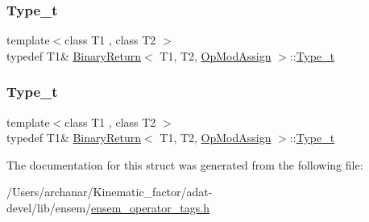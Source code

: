 \mbox{\label{structBinaryReturn_3_01T1_00_01T2_00_01OpModAssign_01_4_ae184d3c020adc86d2a8e45d393ea778c}} 
\subsubsection{\texorpdfstring{Type\_t}{Type\_t}\hspace{0.1cm}{\footnotesize\ttfamily [2/3]}}
{\footnotesize\ttfamily template$<$class T1 , class T2 $>$ \\
typedef T1\& \mbox{\hyperlink{structBinaryReturn}{Binary\+Return}}$<$ T1, T2, \mbox{\hyperlink{structOpModAssign}{Op\+Mod\+Assign}} $>$\+::\mbox{\hyperlink{structBinaryReturn_3_01T1_00_01T2_00_01OpModAssign_01_4_ae184d3c020adc86d2a8e45d393ea778c}{Type\+\_\+t}}}

\mbox{\label{structBinaryReturn_3_01T1_00_01T2_00_01OpModAssign_01_4_ae184d3c020adc86d2a8e45d393ea778c}} 
\subsubsection{\texorpdfstring{Type\_t}{Type\_t}\hspace{0.1cm}{\footnotesize\ttfamily [3/3]}}
{\footnotesize\ttfamily template$<$class T1 , class T2 $>$ \\
typedef T1\& \mbox{\hyperlink{structBinaryReturn}{Binary\+Return}}$<$ T1, T2, \mbox{\hyperlink{structOpModAssign}{Op\+Mod\+Assign}} $>$\+::\mbox{\hyperlink{structBinaryReturn_3_01T1_00_01T2_00_01OpModAssign_01_4_ae184d3c020adc86d2a8e45d393ea778c}{Type\+\_\+t}}}



The documentation for this struct was generated from the following file\+:\begin{DoxyCompactItemize}
\item 
/\+Users/archanar/\+Kinematic\+\_\+factor/adat-\/devel/lib/ensem/\mbox{\hyperlink{adat-devel_2lib_2ensem_2ensem__operator__tags_8h}{ensem\+\_\+operator\+\_\+tags.\+h}}\end{DoxyCompactItemize}
